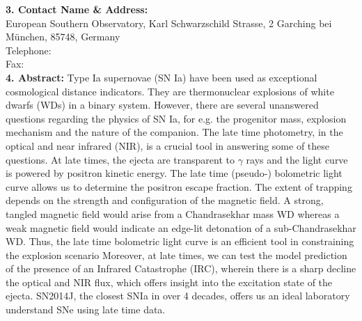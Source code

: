 \documentclass[11pt]{article}
\begin{document}
%
{\bf 3. Contact Name \& Address: }\\
European Southern Observatory,
Karl Schwarzschild Strasse, 2
Garching bei M{\"u}nchen, 85748, 
Germany
\\
Telephone:\\
Fax:\\
%
\textbf{ 4. Abstract: }
Type Ia supernovae (SN Ia) have been used as exceptional cosmological distance indicators. They are thermonuclear explosions of white dwarfs (WDs) in a binary system. However, there are several unanswered questions regarding the physics  of SN Ia, for e.g. the progenitor mass, explosion mechanism and the nature of the companion. The late time photometry, in the optical and near infrared (NIR), is a crucial tool in answering some of these questions. At late times, the ejecta are transparent to $\gamma$ rays and the light curve is powered by positron kinetic energy. The late time (pseudo-) bolometric light curve allows us to determine the positron escape fraction. The extent of trapping depends on the strength and configuration of the magnetic field. A strong, tangled magnetic field would arise from a Chandrasekhar mass WD whereas a weak magnetic field would indicate an edge-lit detonation of a sub-Chandrasekhar WD. Thus, the late time bolometric light curve is an efficient tool in constraining the explosion scenario
Moreover, at late times, we can test the model prediction of the presence of an Infrared Catastrophe (IRC), wherein there is a sharp decline the optical and NIR flux, which offers insight into the excitation state of the ejecta. SN2014J, the closest SNIa in over 4 decades, offers us an ideal laboratory understand SNe using late time data. %
\end{document}
